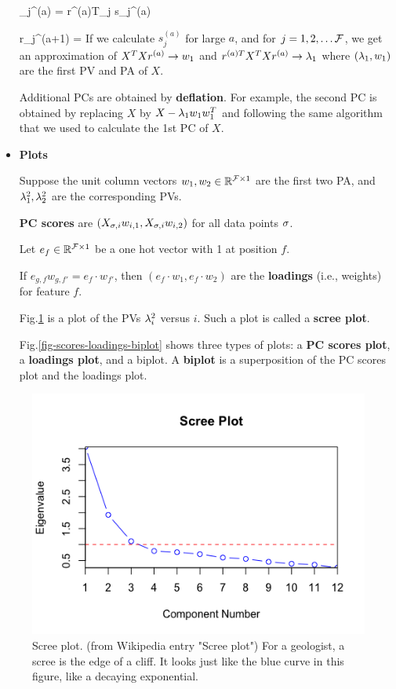 \begin{itemize}
\beq
\lam_j^{(a)} = r^{(a)T}_j s_j^{(a)}
\eeq

\beq
r_{j}^{(a+1)} =
\eeq
If we calculate $s_j^{(a)}$ for large $a$, and for $j=1, 2, \ldots {\cal F}$, we get an approximation of
$X^T X r^{(a)}\rightarrow w_1$ and 
$r^{(a)T}X^T X r^{(a)}\rightarrow \lambda_1$ where
$(\lambda_1, w_1)$ are the first PV and PA of $X$.

Additional PCs are obtained by {\bf deflation}. 
For example, the second PC is obtained by 
replacing $X$ by $X -\lambda_1 w_1 w_1^T$ and following the same algorithm that we used to
calculate the 1st PC of $X$.

\item {\bf Plots}
 
 
 Suppose the unit column vectors $w_1,
 w_2\in{ \mathbb{R}}^{{\cal F}\times 1}$
 are the first two PA, and $\lambda_1^2, \lambda_2^2$ are the corresponding PVs.
 
 {\bf PC scores} are $(X_{\sigma, i}w_{i, 1},
 X_{\sigma, i}w_{i, 2})$ for all data points $\sigma$.
 
 
 Let $e_f\in { \mathbb{R}}^{{\cal F}\times 1}$ 
 be a one hot vector with 1 at position $f$.
 
 
 If $e_{g, f}w_{g, f' }= e_f\cdot w_{f'}$,
 then $(e_f\cdot w_1, e_f\cdot w_2)$ are the {\bf loadings} (i.e., weights) for feature $f$.
 
 Fig.\ref{fig-scree} is a plot of the
 PVs $\lambda_i^2$ versus $i$. Such a plot is 
 called a {\bf scree plot}.
 
 Fig.\ref{fig-scores-loadings-biplot}
 shows three types of plots: a {\bf PC scores plot}, a {\bf loadings plot}, and a biplot. A {\bf biplot} is a superposition
 of the PC scores plot and the loadings plot.
 \end{itemize}
 
\begin{figure}[h!]
\centering
\includegraphics[width=5in]
{pca/scree.png}
\caption{Scree plot. (from Wikipedia entry "Scree plot")
For a geologist, a scree is the edge of a cliff. It looks just like the blue 
curve in this figure, like a decaying exponential.}
\label{fig-scree}
\end{figure}

